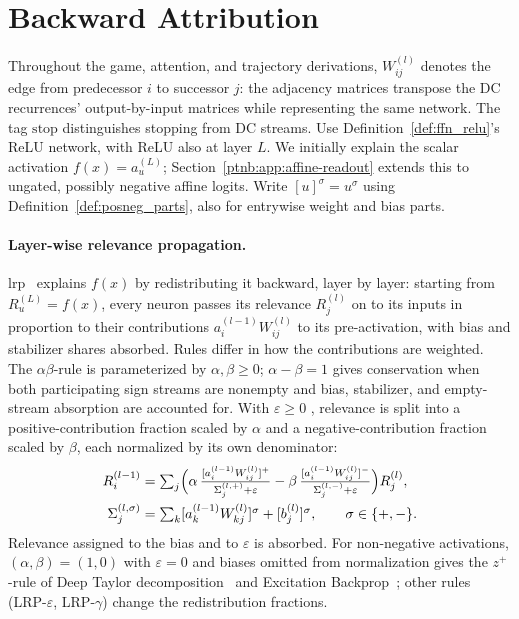 \section{Backward Attribution}\label{ptnb:sec:background}

Throughout the game, attention, and trajectory derivations, $W^{(l)}_{ij}$ denotes the edge from
predecessor $i$ to successor $j$: the adjacency matrices transpose the DC recurrences' output-by-input
matrices while representing the same network. The tag $\mathrm{stop}$ distinguishes stopping from
DC streams. Use Definition~\ref{def:ffn_relu}'s ReLU network, with ReLU also at layer $L$.
We initially explain the scalar activation $f(x)=a_u^{(L)}$;
Section~\ref{ptnb:app:affine-readout} extends this to ungated, possibly negative affine logits.
Write $[u]^\sigma=u^\sigma$ using Definition~\ref{def:posneg_parts}, also for entrywise weight and bias parts.

\paragraph{Layer-wise relevance propagation.} \ac{lrp}~\parencite{Bach2015} explains $f(x)$ by redistributing it backward, layer by layer: starting
from $R^{(L)}_u = f(x)$, every neuron passes its relevance $R^{(l)}_j$ on to its inputs in
proportion to their contributions $a^{(l-1)}_i W^{(l)}_{ij}$ to its pre-activation, with bias and stabilizer shares absorbed.
Rules differ in how the contributions are weighted. The $\alpha\beta$-rule is parameterized by $\alpha,\beta\geq0$;
$\alpha-\beta=1$ gives conservation when both participating sign streams are nonempty and bias,
stabilizer, and empty-stream absorption are accounted for. With $\varepsilon\geq0$
,
relevance is split into a positive-contribution fraction scaled by $\alpha$ and a negative-contribution fraction scaled by
$\beta$, each normalized by its own denominator:
\begin{align}\label{ptnb:eq:lrp-ab}
    R^{(l-1)}_i &= \textstyle\sum_j \Bigl( \alpha\, \tfrac{[a^{(l-1)}_i
    W^{(l)}_{ij}]^+}{\Sigma^{(l,+)}_j + \varepsilon} - \beta\, \tfrac{[a^{(l-1)}_i
    W^{(l)}_{ij}]^-}{\Sigma^{(l,-)}_j + \varepsilon} \Bigr) R^{(l)}_j, \nonumber\\
    \Sigma^{(l,\sigma)}_j &= \textstyle\sum_k [a^{(l-1)}_k W^{(l)}_{kj}]^{\sigma} + [b^{(l)}_j]^{\sigma},\qquad \sigma\in\{+,-\}.
\end{align}
Relevance assigned to the bias and to $\varepsilon$ is absorbed. For non-negative activations,
$(\alpha,\beta)=(1,0)$ with $\varepsilon=0$ and biases omitted from normalization gives the
$z^+$-rule of Deep Taylor decomposition~\parencite{Montavon2017DeepTaylor} and
Excitation Backprop~\parencite{Zhang2018pointinggame}; other rules (LRP-$\varepsilon$, LRP-$\gamma$)
change the redistribution fractions.

